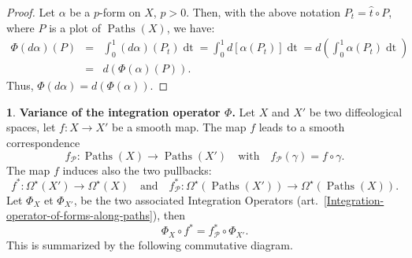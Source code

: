 \documentclass[11pt,reqno]{amsart}
\theoremstyle{definition}
\newtheorem{article}{}
\newcommand{\artlabel}[1]{{\bf #1.}}
\def \P{{P}}
\def \X{{X}}
\newcommand{\cP}{{\mathcal P}}
\newcommand{\art}[1]{{(art.~\ref{#1})}}
\newcommand{\DForms}{\Omega}
\newcommand{\Paths}{\operatorname{Paths}}
\newcommand{\dt}{\operatorname{dt}}
\def \fPaths#1{#1_{\cP}}
\begin{document}
  \begin{proof}
    Let $\alpha$ be a $p$-form on $\X$, $p>0$. Then, with the above notation 
    $\P_t = {\hat t} \circ \P$, where $\P$ is a plot of $\Paths(\X)$, we have:
    \begin{eqnarray*}
      \Phi(d\alpha)(\P) & = &
      \int_0^1 (d\alpha)(\P_t)
      \dt = 
      \int_0^1 d[\alpha(\P_t)] \dt = 
      d \left(\int_0^1 \alpha(\P_t)
      \dt \right)\\
      & = & d (\Phi(\alpha)(\P)).
    \end{eqnarray*}
    Thus, $\Phi(d\alpha) = d(\Phi(\alpha))$.
  \end{proof}
  
  \begin{article}\artlabel{Variance of the integration operator $\Phi$}
    \label{Variance-of-the-integration-operator-Phi}
    Let $\X$ and $\X'$ be two diffeological spaces, let $f:
      \X \to \X'$ be a smooth map. The map $f$ leads to a smooth
    correspondence
    $$
      \fPaths{f}: \Paths(\X) \to \Paths(\X') \quad
      \mbox{with}\quad \fPaths{f}(\gamma) = f \circ \gamma.
      $$
    The map $f$ induces also the two pullbacks:
    $$f^*: \DForms^\star(\X') \to \DForms^\star(\X) \quad
      \mbox{and}\quad  \fPaths{f}^*: \DForms^\star(\Paths(\X'))
      \to \DForms^\star(\Paths(\X)).
      $$
    Let $\Phi_\X$ et $\Phi_{\X'}$, be the two associated
    Integration Operators
    \art{Integration-operator-of-forms-along-paths}, then 
    $$
      \Phi_\X \circ f^* = \fPaths{f}^* \circ \Phi_{\X'}.
      $$
    This is summarized by the following commutative
    diagram.
    \begin{center}
\end{center}

  \end{article} %
  
\end{document}
